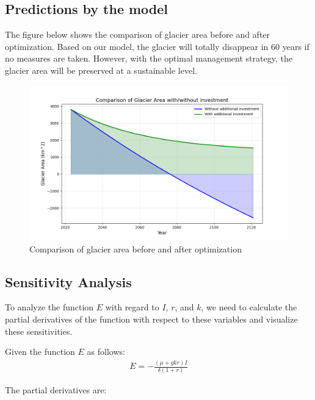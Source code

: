 \documentclass[UTF8]{mcmthesis}
\begin{document}
        \subsection{Predictions by the model}

        The figure below shows the comparison of glacier area before and after optimization. Based on our model, the glacier will totally disappear in 60 years if no measures are taken. However, with the optimal management strategy, the glacier area will be preserved at a sustainable level.
        \begin{figure}[htbp]
            \centering
            \includegraphics[width=18cm]{predict.png}
            \caption{Comparison of glacier area before and after optimization}
        \end{figure}
        \subsection{Sensitivity Analysis}
        \hspace*{2em}To analyze the function \( E \) with regard to \( I \), \( r \), and \( k \), we need to calculate the partial derivatives of the function with respect to these variables and visualize these sensitivities.

        Given the function \( E \) as follows:
        \begin{equation}
            \begin{aligned}
            E = -\frac{(\mu + gkr)I}{\delta(1 + r)}
            \end{aligned}
            \end{equation}
            
        The partial derivatives are:
\end{document}
